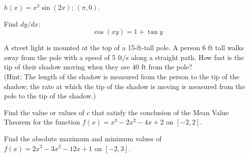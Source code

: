 \documentclass[12pt]{amsart}
\begin{document}
\vspace{2in}

\begin{thm}[15 Points]
  \(\displaystyle{h(x) = x^3\sin(2x)}\); \((\pi,0)\).
\end{thm}

\newpage

\begin{thm}[15 Points]
  Find $dy/dx$: $$\cos(xy)=1+\tan y$$
\end{thm}

\vspace{3in}

\begin{thm}[20 Points]
  A street light is mounted at the top of a 15-ft-tall pole.  A person 6 ft tall walks away from the pole with a speed of 5 ft/s along a straight path.  How fast is the tip of their shadow moving when they are 40 ft from the pole?\\ (Hint: The length of the shadow is measured from the person to the tip of the shadow; the rate at which the tip of the shadow is moving is measured from the pole to the tip of the shadow.)
\end{thm}

\newpage

\begin{thm}[15 Points]
  Find the value or values of $c$ that satisfy the conclusion of the Mean Value Theorem for the function $f(x)=x^3 - 2x^2 -4x + 2$ on $[-2,2]$.
\end{thm}

\vspace{3in}

\begin{thm}[15 Points]
  Find the absolute maximum and minimum values of $f(x)=2x^3 - 3x^2 -12x + 1$ on $[-2,3]$.
\end{thm}

\newpage
\end{document}
